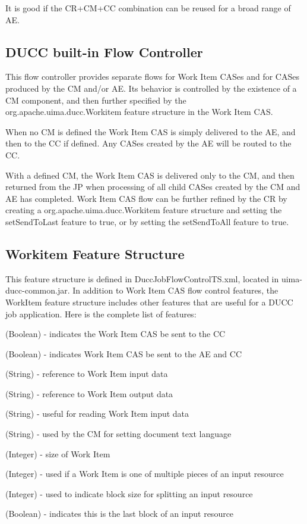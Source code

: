 It is good if the CR+CM+CC combination can be reused for a broad range of AE.

\subsection{DUCC built-in Flow Controller}
This flow controller provides separate flows for Work Item CASes and for CASes produced by the CM and/or AE.
Its behavior is controlled by the existence of a CM component, and then further specified by the
org.apache.uima.ducc.Workitem feature structure in the Work Item CAS.

When no CM is defined the Work Item CAS is simply delivered to the AE, and then to the CC if defined. 
Any CASes created by the AE will be routed to the CC.

With a defined CM, the Work Item CAS is delivered only to the CM, and then returned from the JP when processing
of all child CASes created by the CM and AE has completed. Work Item CAS flow can be further refined by the CR by
creating a org.apache.uima.ducc.Workitem feature structure and setting the setSendToLast feature to true,
or by setting the setSendToAll feature to true.

\subsection{Workitem Feature Structure}
This feature structure is defined in DuccJobFlowControlTS.xml, located in uima-ducc-common.jar.
In addition to Work Item CAS flow control features, the WorkItem feature structure includes other features that are useful
for a DUCC job application. Here is the complete list of features:

\begin{description}[labelindent=0.5in,leftmargin=0.5in]
  \item[sendToLast] (Boolean) - indicates the Work Item CAS be sent to the CC
  \item[sendToAll] (Boolean) - indicates Work Item CAS be sent to the AE and CC
  \item[inputspec] (String) - reference to Work Item input data
  \item[outputspec] (String) - reference to Work Item output data
  \item[encoding] (String) - useful for reading Work Item input data
  \item[language] (String) - used by the CM for setting document text language
  \item[bytelength] (Integer) - size of Work Item
  \item[blockindex] (Integer) - used if a Work Item is one of multiple pieces of an input resource
  \item[blocksize] (Integer) - used to indicate block size for splitting an input resource
  \item[lastBlock] (Boolean) - indicates this is the last block of an input resource
\end{description}

